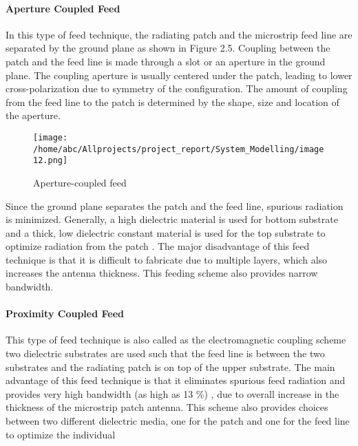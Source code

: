 \documentclass[12pt]{article}
\begin{document}
					                \paragraph{Aperture Coupled Feed}
					                 \justify
					                  In this type of feed technique, the radiating patch and the microstrip feed line are separated by the ground plane as shown in Figure 2.5. Coupling between the patch and the feed line is made through a slot or an aperture in the ground plane.  The coupling aperture is usually centered under the patch, leading to lower cross-polarization due to symmetry of the configuration. The amount of coupling from the feed line to the patch is determined by the shape, size and location of the aperture.
					                    \begin{figure}[H]
					                    	\centering
					                    	\texttt{[image: /home/abc/Allprojects/project\_report/System\_Modelling/image12.png]}
					                    	\caption{Aperture-coupled feed }	             	
					                    \end{figure}
					                   Since the ground plane separates the patch and the feed line, spurious radiation is minimized. Generally, a high dielectric material is used for bottom substrate and a thick, low dielectric constant material is used for the top substrate to optimize radiation from the patch . The major disadvantage of this feed technique is that it is difficult to fabricate due to multiple layers, which also increases the antenna thickness. This feeding scheme also provides narrow bandwidth.
					                  
					                 \paragraph{ Proximity Coupled Feed}
					                  \justify
					                   This type of feed technique is also called as the electromagnetic coupling scheme two dielectric substrates are used such that the feed line is between the two substrates and the radiating patch is on top of the upper substrate. The main advantage of this feed technique is that it eliminates spurious feed radiation and provides very high bandwidth (as high as 13 \%) , due to overall increase in the thickness of the microstrip patch antenna. This scheme also provides choices between two different dielectric media, one for the patch and one for the feed line to optimize the individual 
\end{document}
